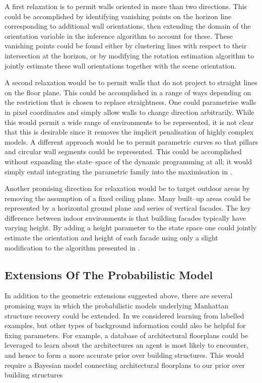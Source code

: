 A first relaxation is to permit walls oriented in more than two
directions. This could be accomplished by identifying vanishing
points on the horizon line corresponding to additional wall
orientations, then extending the domain of the orientation variable in
the inference algorithm to account for these. These vanishing points
could be found either by clustering lines with respect to their
intersection at the horizon, or by modifying the rotation estimation
algorithm to jointly estimate these wall orientations together with
the scene orientation.

A second relaxation would be to permit walls that do not project to
straight lines on the floor plane. This could be accomplished in a
range of ways depending on the restriction that is chosen to replace
straightness. One could parametrise walls in pixel coordinates and
simply allow walls to change direction arbitrarily. While this would
permit a wide range of environments to be represented, it is not clear
that this is desirable since it removes the implicit penalisation of
highly complex models. A different approach would be to permit
parametric curves so that pillars and circular wall segments could be
represented. This could be accomplished without expanding the
state--space of the dynamic programming at all; it would simply entail
integrating the parametric family into the maximisation in
.

Another promising direction for relaxation would be to target outdoor
areas by removing the assumption of a fixed ceiling plane. Many
built--up areas could be represented by a horizontal ground plane and
series of vertical facades. The key difference between indoor
environments is that building facades typically have varying
height. By adding a height parameter to the state space one could
jointly estimate the orientation and height of each facade using only
a slight modification to the algorithm presented in
.

\subsection{Extensions Of The Probabilistic Model}

In addition to the geometric extensions suggested above, there are
several promising ways in which the probabilistic models underlying
Manhattan structure recovery could be extended. In 
we considered learning from labelled examples, but other types of
background information could also be helpful for fixing
parameters. For example, a database of architectural floorplans could
be leveraged to learn about the architectures an agent is most likely
to encounter, and hence to form a more accurate prior over building
structures. This would require a Bayesian model connecting
architectural floorplans to our prior over building structures

